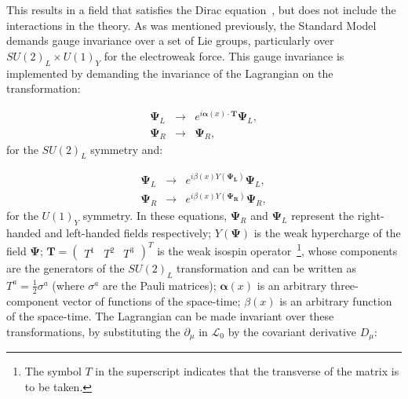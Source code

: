 This results in a field that satisfies the Dirac equation~\cite{qft}, but does not include the interactions in the theory.
As was mentioned previously, the Standard Model demands gauge invariance over a set of Lie groups, particularly over
$SU(2)_L \times U(1)_Y$ for the electroweak force. This gauge invariance is implemented by demanding the invariance of the Lagrangian 
on the transformation:


\begin{eqnarray}
\displaystyle
\mathbf{\Psi}_L & \rightarrow & e^{i \mathbf{\alpha}(x) \cdot \mathbf{T}} \mathbf{\Psi}_L , \nonumber\\
\mathbf{\Psi}_R & \rightarrow & \mathbf{\Psi}_R ,
\label{eq:gauge_su2}
\end{eqnarray}
for the $SU(2)_L$ symmetry and:

\begin{eqnarray}
\displaystyle
\mathbf{\Psi}_L & \rightarrow & e^{i \beta(x) Y(\mathbf{\Psi_L}) } \mathbf{\Psi}_L , \nonumber\\
\mathbf{\Psi}_R & \rightarrow & e^{i \beta(x) Y(\mathbf{\Psi_R}) } \mathbf{\Psi}_R ,
\label{eq:gauge_su1}
\end{eqnarray}
for the $U(1)_Y$ symmetry.
In these equations, $\mathbf{\Psi}_R$ and $\mathbf{\Psi}_L$ represent the right-handed and left-handed fields respectively;
$Y(\mathbf{\Psi})$ is the weak hypercharge of the field $\mathbf{\Psi}$;
$\mathbf{T} = \begin{pmatrix} T^1 & T^2 & T^3 \end{pmatrix}^{T}$ is the weak isospin operator~\footnote{The symbol $T$ in the superscript indicates that the transverse of the matrix is to be taken.}, whose components are the generators of the $SU(2)_L$ transformation and can be
written as $T^a = \frac{1}{2} \sigma^a$ (where $\sigma^a$ are the Pauli matrices);
$\mathbf{\alpha}(x)$
is an arbitrary three-component vector of functions of the space-time; $\beta(x)$ is an arbitrary function
of the space-time. The Lagrangian can be made invariant over these transformations, by substituting the $\partial_\mu$ in $\mathcal{L}_0$ by the covariant derivative
$D_\mu$:

